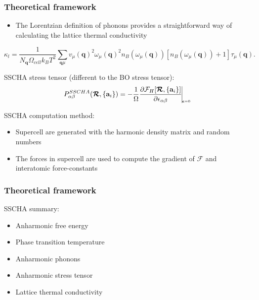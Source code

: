 \documentclass{beamer}
\begin{document}
\begin{frame}

\frametitle{Theoretical framework}
\begin{itemize}
 \item The Lorentzian definition of phonons provides a straightforward way of calculating the lattice thermal conductivity
\end{itemize}
\begin{equation}
\nonumber
 \kappa_{l}=\frac{1}{N_{\mathbf{q}}\Omega_{cell} k_{B}T^{2}}\sum_{\mathbf{q}\mu}v_{\mu}(\mathbf{q})^{2}\omega_{\mu}(\mathbf{q})^{2}n_{B}(\omega_{\mu}(\mathbf{q}))[n_{B}(\omega_{\mu}(\mathbf{q}))+1]\tau_{\mu}(\mathbf{q}).
\end{equation}

SSCHA stress tensor (different to the BO stress tensor):
\begin{equation}
\nonumber
 P_{\alpha\beta}^{SSCHA}(\boldsymbol{\mathcal{R}},\{\mathbf{a}_{i}\})=-\frac{1}{\Omega}\frac{\partial\mathcal{F}_{H}[\boldsymbol{\mathcal{R}},\{\mathbf{a}_{i}\}]}{\partial\epsilon_{\alpha\beta}}\vline_{_{_{_{_{_{_{_{
\boldsymbol{\epsilon}=0}}}}}}}}
\end{equation}

SSCHA computation method:
\begin{itemize}
\item Supercell are generated with the harmonic density matrix and random numbers
\item The forces in supercell are used to compute the gradient of $\mathcal{F}$ and interatomic force-constants
\end{itemize}

\end{frame}


\begin{frame}

\frametitle{Theoretical framework}
SSCHA  summary:
\vspace{0.5cm}
\begin{itemize}
\item Anharmonic free energy
\item Phase transition temperature
\item Anharmonic phonons
\item Anharmonic stress tensor
\item Lattice thermal conductivity
\end{itemize}

\end{frame}
\end{document}
